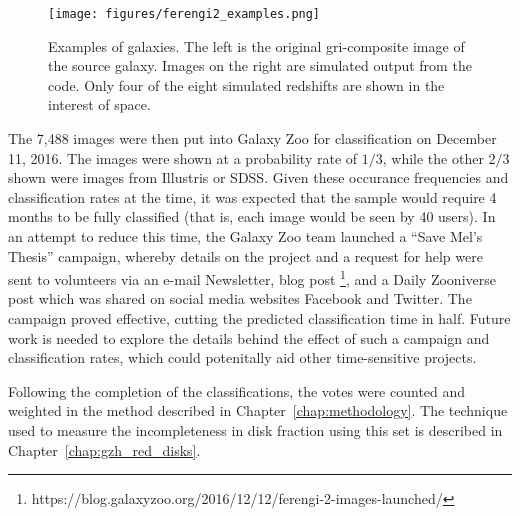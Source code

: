 \begin{figure}
\centering
\texttt{[image: figures/ferengi2\_examples.png]}
\caption{Examples of  galaxies. The left is the original gri-composite image of the source galaxy. Images on the right are simulated output from the \ferengi{} code. Only four of the eight simulated redshifts are shown in the interest of space.} 
\label{fig:ferengi2_examples}
\end{figure}

The 7,488  images were then put into Galaxy Zoo for classification on December 11, 2016. The images were shown at a probability rate of $1/3$, while the other $2/3$ shown were images from Illustris or SDSS. Given these occurance frequencies and classification rates at the time, it was expected that the sample would require 4 months to be fully classified (that is, each image would be seen by 40 users). In an attempt to reduce this time, the Galaxy Zoo team launched a ``Save Mel's Thesis'' campaign, whereby details on the project and a request for help were sent to volunteers via an e-mail Newsletter, blog post \footnote{https://blog.galaxyzoo.org/2016/12/12/ferengi-2-images-launched/}, and a Daily Zooniverse post which was shared on social media websites Facebook and Twitter. The campaign proved effective, cutting the predicted classification time in half. Future work is needed to explore the details behind the effect of such a campaign and classification rates, which could potenitally aid other time-sensitive projects. 

Following the completion of the  classifications, the votes were counted and weighted in the method described in Chapter~\ref{chap:methodology}. The technique used to measure the incompleteness in disk fraction using this set is described in Chapter~\ref{chap:gzh_red_disks}. 




